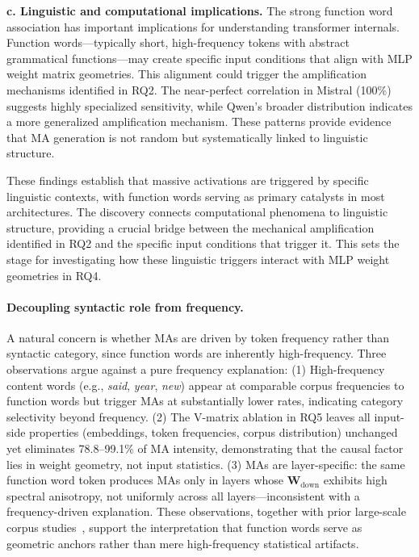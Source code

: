\documentclass[conference]{IEEEtran}
\begin{document}
\smallskip
\noindent\textbf{c. Linguistic and computational implications.}
The strong function word association has important implications for understanding transformer internals. Function words—typically short, high-frequency tokens with abstract grammatical functions—may create specific input conditions that align with MLP weight matrix geometries. This alignment could trigger the amplification mechanisms identified in RQ2. The near-perfect correlation in Mistral (100\%) suggests highly specialized sensitivity, while Qwen's broader distribution indicates a more generalized amplification mechanism. These patterns provide evidence that MA generation is not random but systematically linked to linguistic structure.

These findings establish that massive activations are triggered by specific linguistic contexts, with function words serving as primary catalysts in most architectures. The discovery connects computational phenomena to linguistic structure, providing a crucial bridge between the mechanical amplification identified in RQ2 and the specific input conditions that trigger it. This sets the stage for investigating how these linguistic triggers interact with MLP weight geometries in RQ4.

\vspace{0.5em}
\noindent{}
\vspace{0.5em}

\paragraph{Decoupling syntactic role from frequency.} A natural concern is whether MAs are driven by token frequency rather than syntactic category, since function words are inherently high-frequency. Three observations argue against a pure frequency explanation: (1) High-frequency content words (e.g., \textit{said}, \textit{year}, \textit{new}) appear at comparable corpus frequencies to function words but trigger MAs at substantially lower rates, indicating category selectivity beyond frequency. (2) The V-matrix ablation in RQ5 leaves all input-side properties (embeddings, token frequencies, corpus distribution) unchanged yet eliminates 78.8--99.1\% of MA intensity, demonstrating that the causal factor lies in weight geometry, not input statistics. (3) MAs are layer-specific: the same function word token produces MAs only in layers whose $\mathbf{W}_{\text{down}}$ exhibits high spectral anisotropy, not uniformly across all layers---inconsistent with a frequency-driven explanation. These observations, together with prior large-scale corpus studies~\cite{dao2024massive}, support the interpretation that function words serve as geometric anchors rather than mere high-frequency statistical artifacts.
\end{document}
